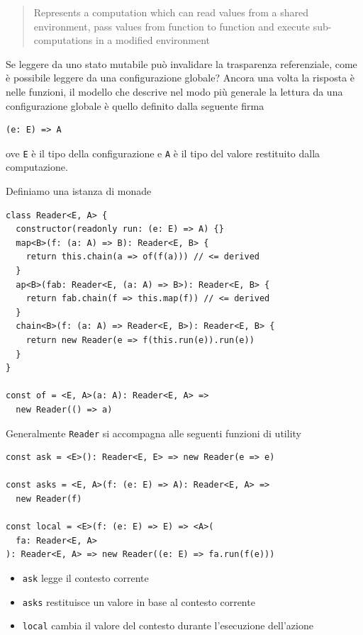 \documentclass[12pt]{article}
\begin{document}
\begin{quote}
Represents a computation which can read values from a shared environment, pass values from function to function
and execute sub-computations in a modified environment
\end{quote}

Se leggere da uno stato mutabile può invalidare la trasparenza referenziale, come è possibile leggere da una configurazione globale?
Ancora una volta la risposta è nelle funzioni, il modello che descrive nel modo più generale la lettura da una configurazione globale
è quello definito dalla seguente firma

\begin{verbatim}
(e: E) => A
\end{verbatim}

ove \texttt{E} è il tipo della configurazione e \texttt{A} è il tipo del valore restituito dalla computazione.

Definiamo una istanza di monade

\begin{verbatim}
class Reader<E, A> {
  constructor(readonly run: (e: E) => A) {}
  map<B>(f: (a: A) => B): Reader<E, B> {
    return this.chain(a => of(f(a))) // <= derived
  }
  ap<B>(fab: Reader<E, (a: A) => B>): Reader<E, B> {
    return fab.chain(f => this.map(f)) // <= derived
  }
  chain<B>(f: (a: A) => Reader<E, B>): Reader<E, B> {
    return new Reader(e => f(this.run(e)).run(e))
  }
}

const of = <E, A>(a: A): Reader<E, A> =>
  new Reader(() => a)
\end{verbatim}

Generalmente \texttt{Reader} si accompagna alle seguenti funzioni di utility

\begin{verbatim}
const ask = <E>(): Reader<E, E> => new Reader(e => e)

const asks = <E, A>(f: (e: E) => A): Reader<E, A> =>
  new Reader(f)

const local = <E>(f: (e: E) => E) => <A>(
  fa: Reader<E, A>
): Reader<E, A> => new Reader((e: E) => fa.run(f(e)))
\end{verbatim}

\begin{itemize}
  \item \texttt{ask} legge il contesto corrente
  \item \texttt{asks} restituisce un valore in base al contesto corrente
  \item \texttt{local} cambia il valore del contesto durante l'esecuzione dell'azione
\end{itemize}
\end{document}
